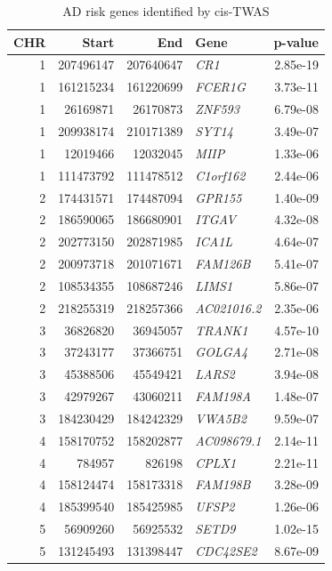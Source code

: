 \begin{longtable}{rrrlr}
\caption{AD risk genes identified by cis-TWAS} \\ 
  \toprule
CHR & Start & End & Gene & p-value \\ 
  \midrule
  1 & 207496147 & 207640647 & \textit{CR1} & 2.85e-19 \\ 
    1 & 161215234 & 161220699 & \textit{FCER1G} & 3.73e-11 \\ 
    1 & 26169871 & 26170873 & \textit{ZNF593} & 6.79e-08 \\ 
    1 & 209938174 & 210171389 & \textit{SYT14} & 3.49e-07 \\ 
    1 & 12019466 & 12032045 & \textit{MIIP} & 1.33e-06 \\ 
    1 & 111473792 & 111478512 & \textit{C1orf162} & 2.44e-06 \\ 
    2 & 174431571 & 174487094 & \textit{GPR155} & 1.40e-09 \\ 
    2 & 186590065 & 186680901 & \textit{ITGAV} & 4.32e-08 \\ 
    2 & 202773150 & 202871985 & \textit{ICA1L} & 4.64e-07 \\ 
    2 & 200973718 & 201071671 & \textit{FAM126B} & 5.41e-07 \\ 
    2 & 108534355 & 108687246 & \textit{LIMS1} & 5.86e-07 \\ 
    2 & 218255319 & 218257366 & \textit{AC021016.2} & 2.35e-06 \\ 
    3 & 36826820 & 36945057 & \textit{TRANK1} & 4.57e-10 \\ 
    3 & 37243177 & 37366751 & \textit{GOLGA4} & 2.71e-08 \\ 
    3 & 45388506 & 45549421 & \textit{LARS2} & 3.94e-08 \\ 
    3 & 42979267 & 43060211 & \textit{FAM198A} & 1.48e-07 \\ 
    3 & 184230429 & 184242329 & \textit{VWA5B2} & 9.59e-07 \\ 
    4 & 158170752 & 158202877 & \textit{AC098679.1} & 2.14e-11 \\ 
    4 & 784957 & 826198 & \textit{CPLX1} & 2.21e-11 \\ 
    4 & 158124474 & 158173318 & \textit{FAM198B} & 3.28e-09 \\ 
    4 & 185399540 & 185425985 & \textit{UFSP2} & 1.26e-06 \\ 
    5 & 56909260 & 56925532 & \textit{SETD9} & 1.02e-15 \\ 
    5 & 131245493 & 131398447 & \textit{CDC42SE2} & 8.67e-09 \\ 

\end{longtable}
